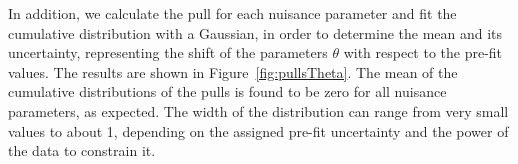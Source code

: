 In addition, we calculate the pull for each nuisance parameter and fit the cumulative distribution with a Gaussian, in order to determine the mean and its uncertainty, representing the shift of the parameters $\theta$ with respect to the pre-fit values. The results are shown in Figure~\ref{fig:pullsTheta}. The mean of the cumulative distributions of the pulls is found to be zero for all nuisance parameters, as expected. The width of the distribution can range from very small values to about 1, depending on the assigned pre-fit uncertainty and the power of the data to constrain it.
\begin{figure}[h!]
\centering
{}
\\

\end{figure}

